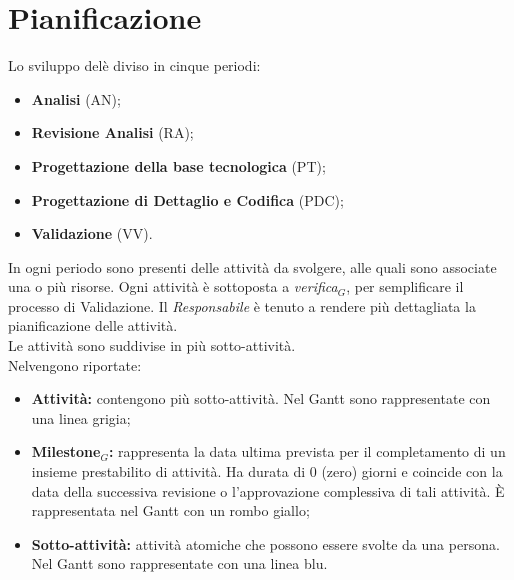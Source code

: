 \chapter{Pianificazione}\label{Pianificazione} 
Lo sviluppo delè diviso in cinque periodi:
\begin{itemize}
    \item \textbf{Analisi} (AN);
    \item \textbf{Revisione Analisi} (RA);
    \item \textbf{Progettazione della base tecnologica} (PT);
    \item \textbf{Progettazione di Dettaglio e Codifica} (PDC);
    \item \textbf{Validazione} (VV).
\end{itemize}
In ogni periodo sono presenti delle attività da svolgere, alle quali sono associate una o più risorse. Ogni attività è sottoposta a \textit{verifica$_{G}$}, per semplificare il processo di Validazione. Il \textit{Responsabile} è tenuto a rendere più dettagliata la pianificazione delle attività.\\
Le attività sono suddivise in più sotto-attività.\\
Nelvengono riportate:
\begin{itemize}
    \item \textbf{Attività:} contengono più sotto-attività. Nel Gantt sono rappresentate con una linea grigia;
    \item \textbf{Milestone$_{G}$:} rappresenta la data ultima prevista per il completamento di un insieme prestabilito di attività. Ha durata di 0 (zero) giorni e coincide con la data della successiva revisione o l'approvazione complessiva di tali attività. È rappresentata nel Gantt con un rombo giallo;
    \item \textbf{Sotto-attività:} attività atomiche che possono essere svolte da una persona. Nel Gantt sono rappresentate con una linea blu.  
\end{itemize}

